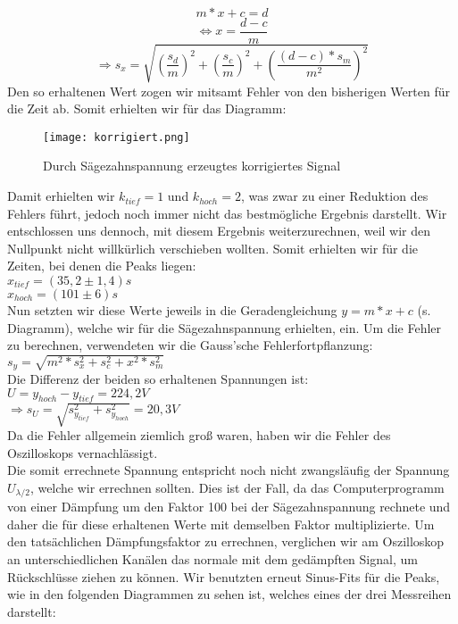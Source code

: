 \[m*x+c=d\]
\[\Leftrightarrow x=\frac{d-c}{m}\]
\[\Rightarrow s_{x}=\sqrt{(\frac{s_{d}}{m})^{2}+(\frac{s_{c}}{m})^{2}+(\frac{(d-c)*s_{m}}{m^{2}})^{2}}\]
Den so erhaltenen Wert zogen wir mitsamt Fehler von den bisherigen Werten für die Zeit ab. Somit erhielten wir für das Diagramm:\\
\begin{figure}[h]
\begin{center}
\texttt{[image: korrigiert.png]}
\caption{Durch Sägezahnspannung erzeugtes korrigiertes Signal}
\end{center}
\end{figure}
\clearpage
Damit erhielten wir $k_{tief}=1$ und $k_{hoch}=2$, was zwar zu einer Reduktion des Fehlers führt, jedoch noch immer nicht das bestmögliche Ergebnis darstellt. Wir entschlossen uns dennoch, mit diesem Ergebnis weiterzurechnen, weil wir den Nullpunkt nicht willkürlich verschieben wollten. Somit erhielten wir für die Zeiten, bei denen die Peaks liegen:\\
$x_{tief}=(35,2\pm1,4)s$\\
$x_{hoch}=(101\pm6)s$\\
Nun setzten wir diese Werte jeweils in die Geradengleichung $y=m*x+c$ (s. Diagramm), welche wir für die Sägezahnspannung erhielten, ein. Um die Fehler zu berechnen, verwendeten wir die Gauss'sche Fehlerfortpflanzung:\\
$s_{y}=\sqrt{m^{2}*s_{x}^{2}+s_{c}^{2}+x^{2}*s_{m}^{2}}$\\
Die Differenz der beiden so erhaltenen Spannungen ist:\\
$U=y_{hoch}-y_{tief}=224,2 V$\\
$\Rightarrow s_{U}=\sqrt{s_{y_{tief}}^{2}+s_{y_{hoch}}^{2}}=20,3 V$\\
Da die Fehler allgemein ziemlich groß waren, haben wir die Fehler des Oszilloskops vernachlässigt.\\
Die somit errechnete Spannung entspricht noch nicht zwangsläufig der Spannung $U_{\lambda/2}$, welche wir errechnen sollten. Dies ist der Fall, da das Computerprogramm von einer Dämpfung um den Faktor 100 bei der Sägezahnspannung rechnete und daher die für diese erhaltenen Werte mit demselben Faktor multiplizierte. Um den tatsächlichen Dämpfungsfaktor zu errechnen, verglichen wir am Oszilloskop an unterschiedlichen Kanälen das normale mit dem gedämpften Signal, um Rückschlüsse ziehen zu können. Wir benutzten erneut Sinus-Fits für die Peaks, wie in den folgenden Diagrammen zu sehen ist, welches eines der drei Messreihen darstellt:\\
